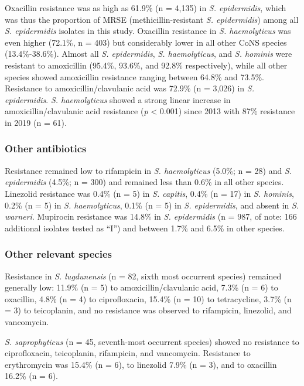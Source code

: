 \documentclass[
]{book}
\begin{document}
Oxacillin resistance was as high as 61.9\% (n = 4,135) in \emph{S. epidermidis}, which was thus the proportion of MRSE (methicillin-resistant \emph{S. epidermidis}) among all \emph{S. epidermidis} isolates in this study. Oxacillin resistance in \emph{S. haemolyticus} was even higher (72.1\%, n = 403) but considerably lower in all other CoNS species (13.4\%-38.6\%). Almost all \emph{S. epidermidis}, \emph{S. haemolyticus}, and \emph{S. hominis} were resistant to amoxicillin (95.4\%, 93.6\%, and 92.8\% respectively), while all other species showed amoxicillin resistance ranging between 64.8\% and 73.5\%. Resistance to amoxicillin/clavulanic acid was 72.9\% (n = 3,026) in \emph{S. epidermidis}. \emph{S. haemolyticus} showed a strong linear increase in amoxicillin/clavulanic acid resistance (\emph{p} \textless{} 0.001) since 2013 with 87\% resistance in 2019 (n = 61).

\hypertarget{other-antibiotics}{%
\subsubsection{Other antibiotics}\label{other-antibiotics}}

Resistance remained low to rifampicin in \emph{S. haemolyticus} (5.0\%; n = 28) and \emph{S. epidermidis} (4.5\%; n = 300) and remained less than 0.6\% in all other species. Linezolid resistance was 0.4\% (n = 5) in \emph{S. capitis}, 0.4\% (n = 17) in \emph{S. hominis}, 0.2\% (n = 5) in \emph{S. haemolyticus}, 0.1\% (n = 5) in \emph{S. epidermidis}, and absent in \emph{S. warneri}. Mupirocin resistance was 14.8\% in \emph{S. epidermidis} (n = 987, of note: 166 additional isolates tested as ``I'') and between 1.7\% and 6.5\% in other species.

\hypertarget{other-relevant-species}{%
\subsubsection{Other relevant species}\label{other-relevant-species}}

Resistance in \emph{S. lugdunensis} (n = 82, sixth most occurrent species) remained generally low: 11.9\% (n = 5) to amoxicillin/clavulanic acid, 7.3\% (n = 6) to oxacillin, 4.8\% (n = 4) to ciprofloxacin, 15.4\% (n = 10) to tetracycline, 3.7\% (n = 3) to teicoplanin, and no resistance was observed to rifampicin, linezolid, and vancomycin.

\emph{S. saprophyticus} (n = 45, seventh-most occurrent species) showed no resistance to ciprofloxacin, teicoplanin, rifampicin, and vancomycin. Resistance to erythromycin was 15.4\% (n = 6), to linezolid 7.9\% (n = 3), and to oxacillin 16.2\% (n = 6).
\end{document}
